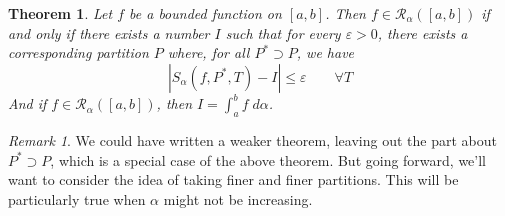 \documentclass[12pt]{article}
\theoremstyle{plain}
\newtheorem{thm}{Theorem}[subsection]
\theoremstyle{definition}
\theoremstyle{remark}
\newtheorem*{rmk}{Remark}
\begin{document}
\begin{thm}
\label{weaker}
Let $f$ be a bounded function on $[a,b]$. Then $f\in\mathscr{R}_\alpha([a,b])$ if and only if there exists a number $I$ such that for every $\varepsilon>0$, there exists a corresponding partition $P$ where, for all $P^* \supset P$, we have 
    \[ |S_\alpha(f,P^*,T) - I | \leq \varepsilon \qquad \forall T\]
And if $f\in\mathscr{R}_\alpha([a,b])$, then $I = \int^b_a f\;d\alpha$.
\end{thm}
\begin{rmk}
We could have written a weaker theorem, leaving out the part about $P^*\supset P$, which is a special case of the above theorem.  But going forward, we'll want to consider the idea of taking finer and finer partitions. This will be particularly true when $\alpha$ might not be increasing.
\end{rmk}
\end{document}
